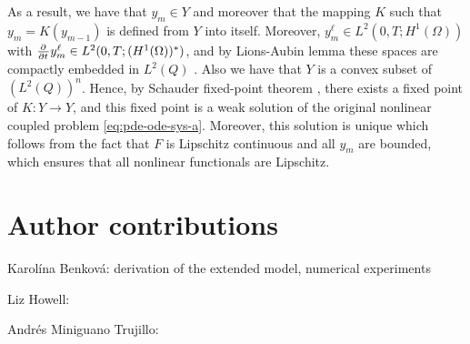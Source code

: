 \documentclass[11pt]{article}
\numberwithin{equation}{section}
\begin{document}
As a result, we have that \(y_m \in Y\) and moreover that the mapping \(K\) such that \( y_m = K(y_{m-1})\) is defined from \(Y \) into itself. Moreover, 
\(y_m^\ell \in L^2(0,T; H^1(\Omega))\) with \(\pd{ }{t} y_m^\ell \in L^2(0,T; (H^1(\Omega))^*)\), and 
by Lions-Aubin lemma these spaces are compactly embedded in \(L^2(Q)\) \cite{Aubin-1963}. Also we have that \(Y\) is a convex subset of \((L^2(Q))^n\). 
Hence, by Schauder fixed-point theorem \cite{Zeidler-1998}, there exists a fixed point of \(K:Y\to Y\), and this fixed point is a weak solution of the original nonlinear coupled problem \eqref{eq:pde-ode-sys-a}. Moreover, this  solution is unique which follows from the fact that \(F\) is Lipschitz continuous and all \(y_m\) are bounded, which ensures that all nonlinear functionals are Lipschitz.































\newpage
\section{Author contributions}
\noindent Karolína Benková: derivation of the extended model, numerical experiments

\noindent Liz Howell:

\noindent Andrés Miniguano Trujillo:

\clearpage
\newpage




% 
\newpage
\nocite{*} 
\printbibliography
\end{document}

